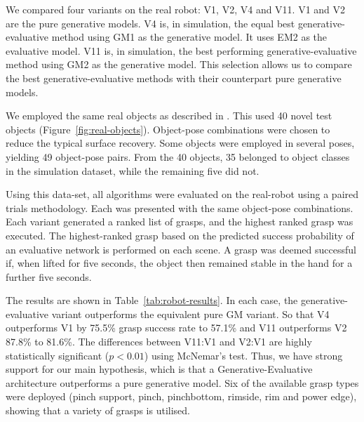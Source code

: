 We compared four variants on the real robot: V1, V2, V4 and V11. V1 and V2 are the pure generative models. V4 is, in simulation, the equal best generative-evaluative method using GM1 as the generative model. It uses EM2 as the evaluative model. V11 is, in simulation, the best performing generative-evaluative method using GM2 as the generative model. This selection allows us to compare the best generative-evaluative methods with their counterpart pure generative models. 

We employed the same real objects as described in \cite{kopicki2019ijrr}. This used 40 novel test objects (Figure~\ref{fig:real-objects}). Object-pose combinations were chosen to reduce the typical surface recovery. Some objects were employed in several poses, yielding 49 object-pose pairs. From the 40 objects, 35 belonged to object classes in the simulation dataset, while the remaining five did not. 

Using this data-set, all algorithms were evaluated on the real-robot using a paired trials methodology. Each was presented with the same object-pose combinations. Each variant generated a ranked list of grasps, and the highest ranked grasp was executed. The highest-ranked grasp based on the predicted success probability of an evaluative network is performed on each scene. A grasp was deemed successful if, when lifted for five seconds, the object then remained stable in the hand for a further five seconds. 

The results are shown in Table~\ref{tab:robot-results}. In each case, the generative-evaluative variant outperforms the equivalent pure GM variant. So that V4 outperforms V1 by 75.5\% grasp success rate to 57.1\% and V11 outperforms V2 87.8\% to 81.6\%. The differences between V11:V1 and V2:V1 are highly statistically significant ($p<0.01$) using McNemar's test. Thus, we have strong support for our main hypothesis, which is that a Generative-Evaluative architecture outperforms a pure generative model. Six of the available grasp types were deployed (pinch support, pinch, pinchbottom, rimside, rim and power edge), showing that a variety of grasps is utilised.

